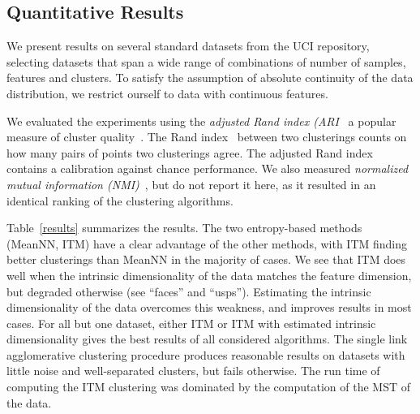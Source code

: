 \subsection{Quantitative Results}
We present results on several standard datasets from the UCI repository, 
selecting datasets that span a wide range of combinations of number
of samples, features and clusters.
To satisfy the assumption of absolute continuity of the data distribution, 
we restrict ourself to data with continuous features.

We evaluated the experiments using the \emph{adjusted Rand index 
(ARI}~\citep{hubert1985comparing} a popular measure
of cluster quality~\citep{gomes2010discriminative,kamvar2003spectral}.
The Rand index~\citep{rand1971objective} between two clusterings counts on how
many pairs of points two clusterings agree. The adjusted Rand index contains a
calibration against chance performance.
We also measured \emph{normalized mutual information
(NMI)}~\citep{strehl2003cluster}, but do not report it here, as it resulted in
an identical ranking of the clustering algorithms.

Table~\ref{results} summarizes the results. The two entropy-based methods 
(MeanNN, ITM) have a clear advantage of the other methods, with ITM finding 
better clusterings than MeanNN in the majority of cases.
We see that ITM does well when the intrinsic dimensionality of the data matches
the feature dimension, but degraded otherwise (see ``faces'' and ``usps'').
Estimating the intrinsic dimensionality of the data overcomes this weakness,
and improves results in most cases. For all but one dataset, either ITM or ITM with
estimated intrinsic dimensionality gives the best results of all considered
algorithms.
%
The single link agglomerative clustering procedure produces reasonable 
results on datasets with little noise and well-separated clusters, but 
fails otherwise.
%
The run time of computing the ITM clustering was dominated by the computation
of the MST of the data.
%

